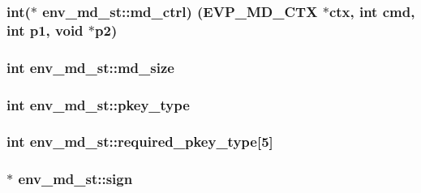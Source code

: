 \subsubsection[{\texorpdfstring{md\+\_\+ctrl}{md_ctrl}}]{\setlength{\rightskip}{0pt plus 5cm}int($\ast$ env\+\_\+md\+\_\+st\+::md\+\_\+ctrl) ({\bf E\+V\+P\+\_\+\+M\+D\+\_\+\+C\+TX} $\ast$ctx, int cmd, int p1, void $\ast$p2)}\hypertarget{structenv__md__st_a0f91a62137d598f55b1e7a321ccbf100}{}\label{structenv__md__st_a0f91a62137d598f55b1e7a321ccbf100}
\subsubsection[{\texorpdfstring{md\+\_\+size}{md_size}}]{\setlength{\rightskip}{0pt plus 5cm}int env\+\_\+md\+\_\+st\+::md\+\_\+size}\hypertarget{structenv__md__st_a7de9719a79492ba980f18f546ff160cf}{}\label{structenv__md__st_a7de9719a79492ba980f18f546ff160cf}
\subsubsection[{\texorpdfstring{pkey\+\_\+type}{pkey_type}}]{\setlength{\rightskip}{0pt plus 5cm}int env\+\_\+md\+\_\+st\+::pkey\+\_\+type}\hypertarget{structenv__md__st_a30d9b3466b50542b6931476f0ecf2351}{}\label{structenv__md__st_a30d9b3466b50542b6931476f0ecf2351}
\subsubsection[{\texorpdfstring{required\+\_\+pkey\+\_\+type}{required_pkey_type}}]{\setlength{\rightskip}{0pt plus 5cm}int env\+\_\+md\+\_\+st\+::required\+\_\+pkey\+\_\+type\mbox{[}5\mbox{]}}\hypertarget{structenv__md__st_a508c2571ca6389b14b054c49ba3fe7b3}{}\label{structenv__md__st_a508c2571ca6389b14b054c49ba3fe7b3}
\subsubsection[{\texorpdfstring{sign}{sign}}]{$\ast$ env\+\_\+md\+\_\+st\+::sign}\hypertarget{structenv__md__st_a6df1fda17e88ff53073047bede060113}{}\label{structenv__md__st_a6df1fda17e88ff53073047bede060113}
